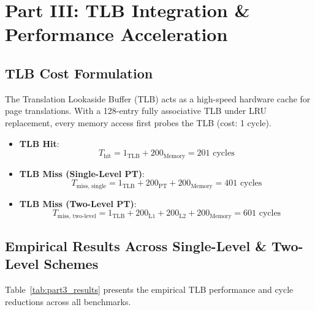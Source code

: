 \documentclass[11pt,a4paper]{article}
\begin{document}
\section{Part III: TLB Integration \& Performance Acceleration}

\subsection{TLB Cost Formulation}
The Translation Lookaside Buffer (TLB) acts as a high-speed hardware cache for page translations. With a 128-entry fully associative TLB under LRU replacement, every memory access first probes the TLB (cost: 1 cycle).
\begin{itemize}
    \item \textbf{TLB Hit}:
    \begin{equation}
        T_{\text{hit}} = 1_{\text{TLB}} + 200_{\text{Memory}} = 201 \text{ cycles}
    \end{equation}
    \item \textbf{TLB Miss (Single-Level PT)}:
    \begin{equation}
        T_{\text{miss, single}} = 1_{\text{TLB}} + 200_{\text{PT}} + 200_{\text{Memory}} = 401 \text{ cycles}
    \end{equation}
    \item \textbf{TLB Miss (Two-Level PT)}:
    \begin{equation}
        T_{\text{miss, two-level}} = 1_{\text{TLB}} + 200_{\text{L1}} + 200_{\text{L2}} + 200_{\text{Memory}} = 601 \text{ cycles}
    \end{equation}
\end{itemize}

\subsection{Empirical Results Across Single-Level \& Two-Level Schemes}
Table~\ref{tab:part3_results} presents the empirical TLB performance and cycle reductions across all benchmarks.
\end{document}
